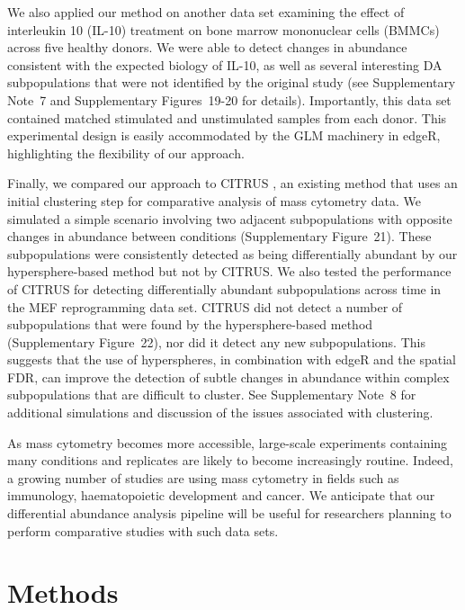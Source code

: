 \documentclass{article}
\newcommand{\suppsecbmmc}{7}
\newcommand{\suppsecclust}{8}
\newcommand{\suppfigbmmc}{19}
\newcommand{\suppfigbmmcmark}{20}
\newcommand{\suppfigclustersim}{21}
\newcommand{\suppfigclusterreal}{22}
\begin{document}
We also applied our method on another data set \cite{levine2015datadriven} examining the effect of interleukin 10 (IL-10) treatment on bone marrow mononuclear cells (BMMCs) across five healthy donors.
We were able to detect changes in abundance consistent with the expected biology of IL-10, as well as several interesting DA subpopulations that were not identified by the original study (see Supplementary Note~\suppsecbmmc{} and Supplementary Figures~\suppfigbmmc{}-\suppfigbmmcmark{} for details).
Importantly, this data set contained matched stimulated and unstimulated samples from each donor.
This experimental design is easily accommodated by the GLM machinery in edgeR, highlighting the flexibility of our approach.

Finally, we compared our approach to CITRUS \cite{bruggner2014automated}, an existing method that uses an initial clustering step for comparative analysis of mass cytometry data.
We simulated a simple scenario involving two adjacent subpopulations with opposite changes in abundance between conditions (Supplementary Figure~\suppfigclustersim{}).
These subpopulations were consistently detected as being differentially abundant by our hypersphere-based method but not by CITRUS.
We also tested the performance of CITRUS for detecting differentially abundant subpopulations across time in the MEF reprogramming data set.
CITRUS did not detect a number of subpopulations that were found by the hypersphere-based method (Supplementary Figure~\suppfigclusterreal{}), nor did it detect any new subpopulations.
This suggests that the use of hyperspheres, in combination with edgeR and the spatial FDR, can improve the detection of subtle changes in abundance within complex subpopulations that are difficult to cluster.
See Supplementary Note~\suppsecclust{} for additional simulations and discussion of the issues associated with clustering.

As mass cytometry becomes more accessible, large-scale experiments containing many conditions and replicates are likely to become increasingly routine.
Indeed, a growing number of studies are using mass cytometry in fields such as immunology, haematopoietic development and cancer.
We anticipate that our differential abundance analysis pipeline will be useful for researchers planning to perform comparative studies with such data sets.

\section{Methods}
\end{document}
